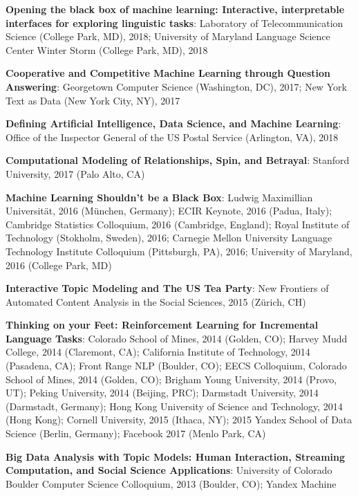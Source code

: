 {{\begin{enumerate*}
\item {\bf Opening the black box of machine learning: Interactive, interpretable interfaces for exploring linguistic tasks}: Laboratory of Telecommunication Science (College Park,
  MD), 2018;  University of Maryland Language Science Center Winter
  Storm (College Park, MD), 2018%
\item {\bf Cooperative and Competitive Machine Learning through
    Question Answering}: Georgetown Computer Science (Washington, DC),
  2017; New York Text as Data (New York City, NY), 2017
\item {\bf Defining Artificial Intelligence, Data Science, and Machine
    Learning}: Office of the Inspector General of the US Postal
  Service (Arlington, VA), 2018
\item {\bf Computational Modeling of Relationships, Spin, and Betrayal}: Stanford University, 2017 (Palo Alto, CA)
\item {\bf Machine Learning Shouldn't be a Black Box}: Ludwig
  Maximillian Universit\"at, 2016 (M\"unchen, Germany); ECIR Keynote,
  2016 (Padua, Italy); Cambridge Statistics Colloquium, 2016
  (Cambridge, England); Royal Institute of Technology (Stokholm,
  Sweden), 2016; Carnegie Mellon University Language Technology
    Institute Colloquium (Pittsburgh, PA), 2016; University of
    Maryland, 2016 (College Park, MD)
	\item {\bf Interactive Topic Modeling and The US Tea Party}: New Frontiers of Automated Content Analysis in the Social Sciences, 2015 (Z\"urich, CH)
	\item {\bf Thinking on your Feet: Reinforcement Learning for Incremental
Language Tasks}: Colorado School of Mines, 2014 (Golden, CO); Harvey
Mudd College, 2014 (Claremont, CA); California Institute of
Technology, 2014 (Pasadena, CA); Front Range NLP (Boulder, CO); EECS
Colloquium, Colorado School of Mines, 2014 (Golden, CO); Brigham Young
University, 2014 (Provo, UT); Peking University, 2014 (Beijing, PRC);
Darmstadt University, 2014 (Darmstadt, Germany); Hong Kong University
of Science and Technology, 2014 (Hong Kong); Cornell University, 2015
(Ithaca, NY); 2015 Yandex School of Data Science (Berlin, Germany); Facebook 2017 (Menlo Park, CA)
	\item {\bf Big Data Analysis with Topic Models: Human
            Interaction, Streaming Computation, and Social Science
            Applications}: University of Colorado Boulder Computer
          Science Colloquium, 2013 (Boulder, CO); Yandex Machine

\end{enumerate*}}}
